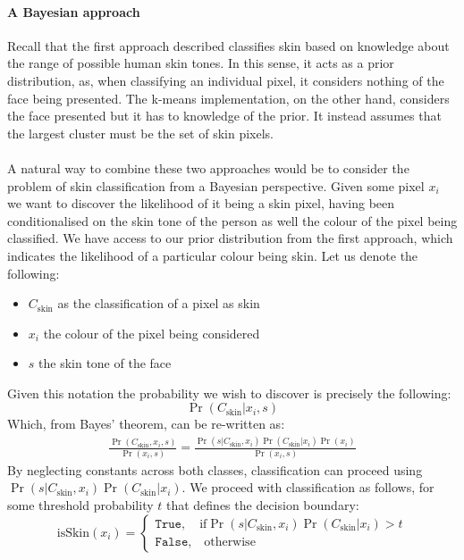 \paragraph{A Bayesian approach}
Recall that the first approach described classifies skin based on knowledge about the range of possible human skin tones. 
In this sense, it acts as a prior distribution, as, when classifying an individual pixel, it considers nothing of the face being presented.
The k-means implementation, on the other hand, considers the face presented but it has to knowledge of the prior. It instead assumes that the largest cluster must be the set of skin pixels.
\\ \\ 
A natural way to combine these two approaches would be to consider the problem of skin classification from a Bayesian perspective. Given some pixel $x_i$ we want to discover the likelihood of it being a skin pixel, having been conditionalised on the skin tone of the person as well the colour of the pixel being classified. 
We have access to our prior distribution from the first approach, which indicates the likelihood of a particular colour being skin.
Let us denote the following: 
\begin{itemize}
   \item $C_{\mathrm{skin}}$ as the classification of a pixel as skin
   \item $x_i$ the colour of the pixel being considered
   \item $s$ the skin tone of the face
\end{itemize} 
Given this notation the probability we wish to discover is precisely the following:
\begin{equation*}
   \Pr(C_{\mathrm{skin}}| x_i, s) 
\end{equation*}
Which, from Bayes' theorem, can be re-written as: 
\begin{align*}
   \frac{\Pr(C_\mathrm{skin}, x_i, s)}{\Pr(x_i, s)} = \frac{\Pr(s|C_\mathrm{skin}, x_i)\Pr(C_\mathrm{skin}|x_i)\Pr(x_i)}{\Pr(x_i,s)}
\end{align*}
By neglecting constants across both classes, classification can proceed using $\Pr(s|C_\mathrm{skin}, x_i)\Pr(C_\mathrm{skin}|x_i)$.
We proceed with classification as follows, for some threshold probability $t$ that defines the decision boundary: 
\begin{equation*}
    \text{isSkin}(x_i) = 
    \begin{cases}
        \texttt{True}, \quad \text{if} \Pr(s|C_\mathrm{skin}, x_i)\Pr(C_\mathrm{skin}|x_i) > t \\
        \texttt{False}, \quad \text{otherwise}
    \end{cases}
\end{equation*}
